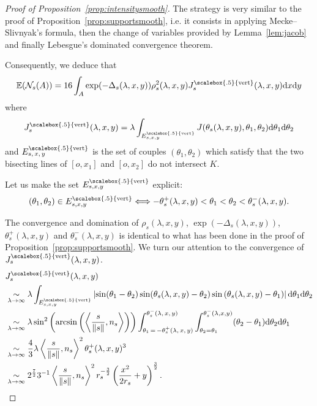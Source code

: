 \documentclass[10pt]{amsart}
\theoremstyle{definition}\newtheorem{defi}[theo]{Definition}\newtheorem{rema}[theo]{Remark}\newtheorem{exam}[theo]{Example}\newtheorem{exem}[theo]{Example}\newtheorem{nota}[theo]{Notation}
\newcommand{\cN}{\mathcal{N}}
\newcommand{\dd}{\mathrm{d}}
\newcommand{\E}{\mathbb{E}}
\DeclareMathOperator{\Vertt}{\scalebox{.5}{vert}}
\newcommand{\pass}{\vspace{0.3cm}\noindent}
\begin{document}
\begin{proof}[{{Proof of Proposition~\ref{prop:intensitysmooth}}}]
The strategy is very similar to the proof of Proposition~\ref{prop:supportsmooth}, i.e. it consists in applying Mecke--Slivnyak's formula, then the change of variables provided by Lemma~\ref{lem:jacob} and finally Lebesgue's dominated convergence theorem.

Consequently, we deduce that
\begin{align}\label{eq:calculintermcotes1}
\E(\cN_s(A)) = 16\int_{A}\exp(-\Delta_s(\lambda,x,y))\rho_s^2(\lambda,x,y)J^{\Vertt}_s(\lambda,x,y)\dd x \dd y
\end{align}
where
\begin{equation*}
J^{\Vertt}_s(\lambda,x,y) =\lambda\int_{E^{\Vertt}_{s,x,y}} J(\theta_s(\lambda,x,y),\theta_1,\theta_2)\dd \theta_1\dd \theta_2
\end{equation*}
and $E^{\Vertt}_{s,\,x,\,y}$ is the set of couples $(\theta_1,\theta_2)$ which satisfy that the two bisecting lines of $[o,x_1]$ and $[o,x_2]$ do not intersect $K$.

Let us make the set $E^{\Vertt}_{s,x,y}$ explicit:
\begin{equation}\label{eq:condangles}
(\theta_1,\theta_2)\in E^{\Vertt}_{s,x,y}\Longleftrightarrow -\theta_s^+(\lambda,x,y)< \theta_1<\theta_2<\theta_s^-(\lambda,x,y).
\end{equation}


The convergence and domination of $\rho_s(\lambda,x,y)$, $\exp(-\Delta_s(\lambda,x,y))$, $\theta_s^+(\lambda,x,y)$ and $\theta_s^-(\lambda,x,y)$ is identical to what has been done in the proof of Proposition~\ref{prop:supportsmooth}. We turn our attention to the convergence of $J^{\Vertt}_s(\lambda,x,y)$.
\begin{align}
&J^{\Vertt}_{s}(\lambda,x,y)\nonumber\\
& \underset{\lambda\to\infty}{\sim}\lambda \int_{E^{\Vertt}_{s,x,y}}\left|\sin(\theta_1-\theta_2)\sin(\theta_s(\lambda,x,y)-\theta_2)\sin\left(\theta_s(\lambda,x,y)-\theta_1\right)\right|
\dd \theta_1\dd \theta_2\nonumber\\
& \underset{\lambda\to\infty}{\sim} \lambda\sin^2\left(\arcsin\left(\left\langle \frac{s}{\|s\|},n_s\right\rangle\right)\right) \int_{\theta_1\,=\,-\theta_s^+(\lambda,\,x,\,y)}^{{\theta}_s^-(\lambda,\,x,\,y)}\int_{\theta_2=\theta_1}^{\theta_s^-(\lambda,x,y)}(\theta_2-\theta_1) \dd \theta_2 \dd\theta_1\nonumber\\
& \underset{\lambda\to\infty}{\sim} \frac{4}{3}\lambda \left\langle \frac{s}{\|s\|},n_s\right\rangle^2 \theta_s^+(\lambda,x,y)^3\nonumber\\
& \underset{\lambda\to\infty}{\sim} 2^{\frac{7}{2}}3^{-1}\left\langle \frac{s}{\|s\|},n_s\right\rangle^2 r_s^{-\frac{3}{2}}\left(\frac{x^2}{2r_s}+y\right)^{\frac{3}{2}}.\label{eq:convJbarre2}
\end{align}


\end{proof}
\end{document}

